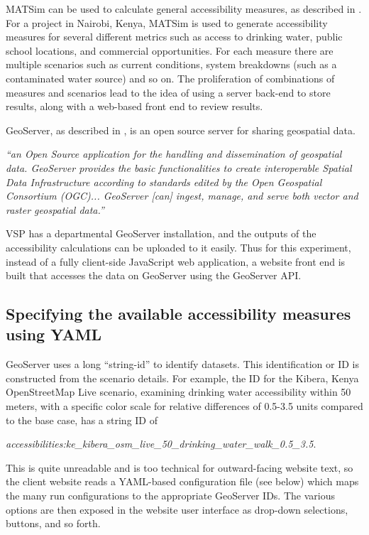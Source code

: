 MATSim can be used to calculate general accessibility measures, as described in \cite{ziemke2018accessibility}. For a project in Nairobi, Kenya, MATSim is used to generate accessibility measures for several different metrics such as access to drinking water, public school locations, and commercial opportunities. For each measure there are multiple scenarios such as current conditions, system breakdowns (such as a contaminated water source) and so on. The proliferation of combinations of measures and scenarios lead to the idea of using a server back-end to store results, along with a web-based front end to review results.

\gls{GeoServer}, as described in \cite{giannecchini2013geoserver}, is an open source server for sharing geospatial data.

\begin{displayquote}
\emph{``an Open Source application for the handling and dissemination of geospatial data. GeoServer provides the basic functionalities to create interoperable Spatial Data Infrastructure according to standards edited by the Open Geospatial Consortium (OGC)... GeoServer [can] ingest, manage, and serve both vector and raster geospatial data.''}
\end{displayquote}

VSP has a departmental GeoServer installation, and the outputs of the accessibility calculations can be uploaded to it easily. Thus for this experiment, instead of a fully client-side JavaScript web application, a website front end is built that accesses the data on GeoServer using the GeoServer API.

\hypertarget{server-experiments-geoserver-2}{%
\subsection{Specifying the available accessibility measures using YAML}
\label{server-experiments-geoserver-2}}

GeoServer uses a long ``string-id'' to identify datasets. This identification or ID is constructed from the scenario details. For example, the ID for the Kibera, Kenya OpenStreetMap Live scenario, examining drinking water accessibility within 50 meters, with a specific color scale for relative differences of 0.5-3.5 units compared to the base case, has a string ID of

\emph{accessibilities:ke\_kibera\_osm\_live\_50\_drinking\_water\_walk\_0.5\_3.5}.

This is quite unreadable and is too technical for outward-facing website text, so the client website reads a YAML-based configuration file (see below) which maps the many run configurations to the appropriate GeoServer IDs. The various options are then exposed in the website user interface as drop-down selections, buttons, and so forth.

